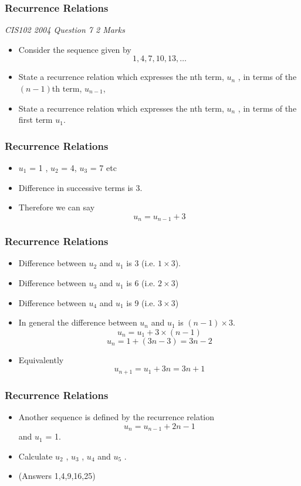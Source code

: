 \documentclass{beamer}
\begin{document}
\begin{frame}
\frametitle{Recurrence Relations}
\textit{CIS102 2004 Question 7 2 Marks}
\Large

\begin{itemize}
\item Consider the sequence given by \[ 1, 4, 7, 10, 13, \ldots\]
\item State a recurrence relation which expresses the nth term, $u_n$
, in terms of the$(n - 1)$th term, $u_{n-1}$, 
\item State a recurrence relation which expresses the nth term, $u_n$
, in terms of the first term $u_1$.
\end{itemize}

\end{frame}
\begin{frame}
\frametitle{Recurrence Relations}
\Large
\begin{itemize}
\item $u_1$ = 1 , $u_2$ = 4, $u_3$ = 7 etc 
\item Difference in successive terms is 3.
\item Therefore we can say 
\[ u_n = u_{n-1} + 3 \]
\end{itemize}
\end{frame}
\begin{frame}
\frametitle{Recurrence Relations}
\large
\begin{itemize}
\item Difference between $u_2$ and $u_1$ is 3 (i.e. $1 \times 3$).
\item Difference between $u_3$ and $u_1$ is 6 (i.e. $2 \times 3$)
\item Difference between $u_4$ and $u_1$ is 9 (i.e. $3 \times 3$)
\item In general the difference between $u_n$ and $u_1$ is $(n-1)\times 3$.
\[ u_{n} = u_1 + 3 \times (n-1) \]
\[ u_{n} = 1 + (3n-3) = 3n-2\]
\item Equivalently
\[ u_{n+1} = u_1 + 3n = 3n+1\]
\end{itemize}
\end{frame}
\begin{frame}
\frametitle{Recurrence Relations}
\Large
\begin{itemize}
\item Another sequence is defined by the recurrence relation 
\[ u_n = u_{n-1} + 2n-1 \] and
$u_1$ = 1.
\item Calculate $u_2$ , $u_3$ , $u_4$  and $u_5$ .
\item (Answers 1,4,9,16,25)
\end{itemize}
\end{frame}
\end{document}
